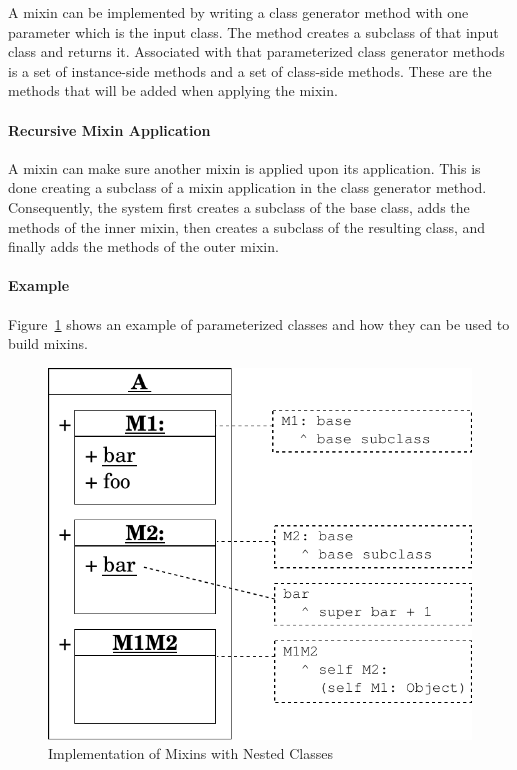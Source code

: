 A mixin can be implemented by writing a class generator method with one parameter which is the input class. The method creates a subclass of that input class and returns it. Associated with that parameterized class generator methods is a set of instance-side methods and a set of class-side methods. These are the methods that will be added when applying the mixin.

\paragraph{Recursive Mixin Application}
A mixin can make sure another mixin is applied upon its application. This is done creating a subclass of a mixin application in the class generator method. Consequently, the system first creates a subclass of the base class, adds the methods of the inner mixin, then creates a subclass of the resulting class, and finally adds the methods of the outer mixin.

\paragraph{Example}
Figure~\ref{fig:concept_mixins} shows an example of parameterized classes and how they can be used to build mixins.

\begin{figure}[!htp]
	\centering
	\includegraphics[scale=1]{nested_mixins.pdf}
	\caption{Implementation of Mixins with Nested Classes}
	\label{fig:concept_mixins}
\end{figure}

